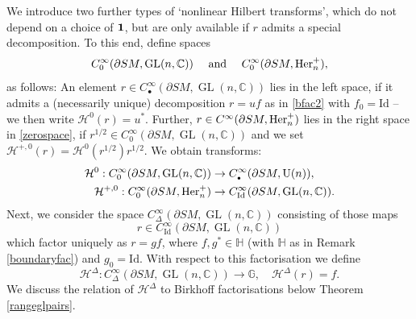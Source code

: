 \documentclass[JEP,XML,SOM,Unicode,published]{cedram}
\DeclareMathOperator{\GL}{GL}
\newcommand{\rU}{\mathrm{U}}
\theoremstyle{plain}
\theoremstyle{definition}
\newcommand{\G}{\mathbb{G}}
\newcommand{\C}{\mathbb{C}}
\newcommand{\HH}{\mathbb{H}}
\renewcommand{\H}{\mathcal{H}}
\newcommand{\he}{\textup{Her}}
\newcommand{\Id}{\mathrm{Id}}
\newcommand{\1}{{\bf 1}}
\newcommand{\extend}{{\scriptscriptstyle\bullet}}
\begin{document}
We introduce two further types of `nonlinear Hilbert transforms', which do not depend on a choice of $\1$, but are only available if $r$ admits a special decomposition. To this end, define spaces
\begin{equation}\label{zerospace}
C_0^\infty(\partial SM,\GL(n,\C))\quad \text{ and } \quad C_0^\infty(\partial SM,\he^+_n),
\end{equation}
as follows: An element $r\in C_\extend^\infty(\partial SM,\GL(n,\C))$ lies in the left space, if it admits a (necessarily unique) decomposition $r=uf$ as in \eqref{bfac2} with $f_0=\Id$ -- we then write $\H^0(r)=u^*$. Further,
$r\in C^\infty(\partial SM,\he^+_n)$ lies in the right space in \eqref{zerospace}, if $r^{1/2}\in C_0^\infty(\partial SM,\GL(n,\C))$ and we set $\H^{+,0}(r) =\H^0(r^{1/2})r^{1/2}$. We obtain transforms:
\begin{align}\label{hilbert0}
\H^0:C_0^\infty(\partial SM,\GL(n,\C))&\to C_\extend^\infty(\partial SM,\rU(n)),\\
\H^{+,0}:C_0^\infty(\partial SM,\he^+_n)&\to C_\Id^\infty(\partial SM,\GL(n,\C)). \label{hilbert+0}
\end{align}
Next, we consider the space $C_\Delta^\infty(\partial SM,\GL(n,\C))$ consisting of those maps
\[r\in C_\Id^\infty(\partial SM,\GL(n,\C))\] which factor uniquely as
$
r=gf$, where $f,g^*\in \HH$ (with $\HH$ as in Remark \ref{boundaryfac}) and $g_0=\Id$.
With respect to this factorisation we define
\begin{equation}\label{hilbertjumping}
\H^\Delta: C_\Delta^\infty(\partial SM,\GL(n,\C)) \to \G, \quad \H^\Delta(r)=f.
\end{equation}
We discuss the relation of $\H^\Delta$ to Birkhoff factorisations below Theorem \ref{rangeglpairs}.
\end{document}
